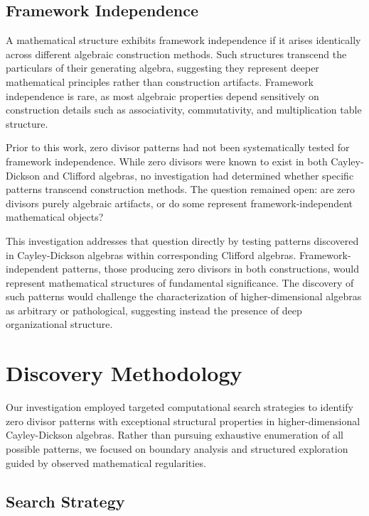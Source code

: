 \documentclass[11pt]{article}
\begin{document}
\subsection{Framework Independence}

A mathematical structure exhibits framework independence if it arises identically across different algebraic construction methods. Such structures transcend the particulars of their generating algebra, suggesting they represent deeper mathematical principles rather than construction artifacts. Framework independence is rare, as most algebraic properties depend sensitively on construction details such as associativity, commutativity, and multiplication table structure.

Prior to this work, zero divisor patterns had not been systematically tested for framework independence. While zero divisors were known to exist in both Cayley-Dickson and Clifford algebras, no investigation had determined whether specific patterns transcend construction methods. The question remained open: are zero divisors purely algebraic artifacts, or do some represent framework-independent mathematical objects?

This investigation addresses that question directly by testing patterns discovered in Cayley-Dickson algebras within corresponding Clifford algebras. Framework-independent patterns, those producing zero divisors in both constructions, would represent mathematical structures of fundamental significance. The discovery of such patterns would challenge the characterization of higher-dimensional algebras as arbitrary or pathological, suggesting instead the presence of deep organizational structure.
\section{Discovery Methodology}
\label{sec:methodology}

Our investigation employed targeted computational search strategies to identify zero divisor patterns with exceptional structural properties in higher-dimensional Cayley-Dickson algebras. Rather than pursuing exhaustive enumeration of all possible patterns, we focused on boundary analysis and structured exploration guided by observed mathematical regularities.

\subsection{Search Strategy}
\end{document}
